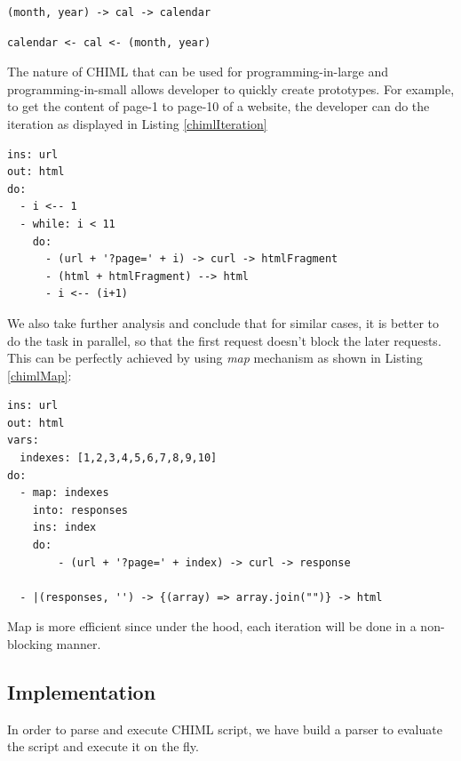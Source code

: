 \documentclass[conference]{IEEEtran}
\begin{document}
\begin{lstlisting}[caption=CHIML Program Example (Short), label=chimlShortExample, basicstyle=\footnotesize, breaklines=true]
(month, year) -> cal -> calendar
\end{lstlisting}

\begin{lstlisting}[caption=CHIML Program Example (Short-Reversed), label=chimlReversedExample, basicstyle=\footnotesize, breaklines=true]
calendar <- cal <- (month, year)
\end{lstlisting}

The nature of CHIML that can be used for programming-in-large and programming-in-small allows developer to quickly create prototypes. For example, to get the content of page-1 to page-10 of a website, the developer can do the iteration as displayed in Listing \ref{chimlIteration}

\begin{lstlisting}[caption=CHIML Iteration, label=chimlIteration, basicstyle=\footnotesize, breaklines=true]
ins: url
out: html
do:
  - i <-- 1
  - while: i < 11
    do:
      - (url + '?page=' + i) -> curl -> htmlFragment
      - (html + htmlFragment) --> html
      - i <-- (i+1)
\end{lstlisting}

We also take further analysis and conclude that for similar cases, it is better to do the task in parallel, so that the first request doesn't block the later requests. This can be perfectly achieved by using {\it map} mechanism as shown in Listing \ref{chimlMap}:

\begin{lstlisting}[caption=CHIML Map Feature, label=chimlMap, basicstyle=\footnotesize, breaklines=true]
ins: url
out: html
vars:
  indexes: [1,2,3,4,5,6,7,8,9,10]
do:
  - map: indexes
    into: responses
    ins: index
    do: 
        - (url + '?page=' + index) -> curl -> response

  - |(responses, '') -> {(array) => array.join("")} -> html
\end{lstlisting}

Map is more efficient since under the hood, each iteration will be done in a non-blocking manner.

\subsection{Implementation}
In order to parse and execute CHIML script, we have build a parser to evaluate the script and execute it on the fly.
\end{document}
